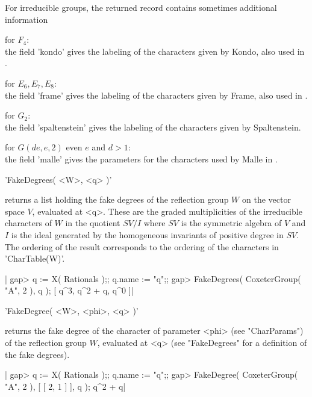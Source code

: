 For  irreducible groups, the returned  record contains sometimes additional
information\:

for  $F_4$:\\ the field 'kondo' gives  the labeling of the characters given
  by Kondo, also used in \cite[(4.10)]{Lus85}.

for  $E_6,  E_7,  E_8$:\\  the  field  'frame'  gives  the  labeling of the
  characters  given  by  Frame,  also  used  in  \cite[(4.11),  (4.12), and
  (4.13)]{Lus85}.

for  $G_2$:\\ the field 'spaltenstein' gives the labeling of the characters
  given by Spaltenstein.

for  $G(de,e,2)$  even  $e$  and  $d>1$:\\  the  field  'malle'  gives  the
  parameters for the characters used by Malle in \cite{Mal96}.


'FakeDegrees( <W>, <q> )'

returns  a list holding the fake degrees of the reflection group $W$ on the
vector  space $V$, evaluated at <q>. These are the graded multiplicities of
the  irreducible characters of $W$ in the quotient $SV/I$ where $SV$ is the
symmetric  algebra of $V$ and $I$ is the ideal generated by the homogeneous
invariants  of  positive  degree  in  $SV$.  The  ordering  of  the  result
corresponds to the ordering of the characters in 'CharTable(W)'.

|    gap> q := X( Rationals );; q.name := "q";;
    gap> FakeDegrees( CoxeterGroup( "A", 2 ), q );
    [ q^3, q^2 + q, q^0 ]|


'FakeDegree( <W>, <phi>, <q> )'

returns  the  fake degree  of  the  character  of parameter  <phi>  (see
"CharParams")  of  the  reflection  group $W$,  evaluated  at  <q>  (see
"FakeDegrees" for a definition of the fake degrees).

|    gap> q := X( Rationals );; q.name := "q";;
    gap> FakeDegree( CoxeterGroup( "A", 2 ), [ [ 2, 1 ] ], q );
    q^2 + q|


